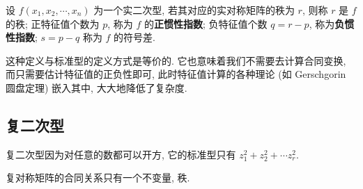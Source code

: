 \documentclass[UTF8]{book}
\begin{document}
\begin{definition}
    设 $f(x_1,x_2,\cdots,x_n)$ 为一个实二次型, 
    若其对应的实对称矩阵的秩为 $r$, 则称 $r$ 是 $f$ 的秩; 
    正特征值个数为 $p$, 
    称为 $f$ 的\textbf{正惯性指数}; 
    负特征值个数 $q=r-p$, 称为\textbf{负惯性指数}; 
    $s = p-q$ 称为 $f$ 的符号差.
\end{definition}

这种定义与标准型的定义方式是等价的. 它也意味着我们不需要去计算合同变换, 
而只需要估计特征值的正负性即可, 此时特征值计算的各种理论 
(如 Gerschgorin 圆盘定理) 嵌入其中, 大大地降低了复杂度. 

\subsection{复二次型}
复二次型因为对任意的数都可以开方, 
它的标准型只有 $z_1^2+z_2^2+\cdots z_r^2$. 

复对称矩阵的合同关系只有一个不变量, 秩. 
\end{document}
